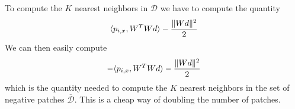 \documentclass{article}
\begin{document}
To compute the $K$ nearest neighbors in $\mathcal{D}$ we have to compute the quantity
\begin{align*} \langle p_{i,x}, W^T W d \rangle - {\|Wd \|^2 \over 2} \end{align*}
We can then easily compute 
\begin{align*} - \langle p_{i,x}, W^T W d \rangle - {\|Wd \|^2 \over 2} \end{align*} which is the quantity needed to compute the $K$ nearest neighbors in the set of negative patches $\overline{\mathcal{D}}$.
This is a cheap way of doubling the number of patches.
\end{document}
